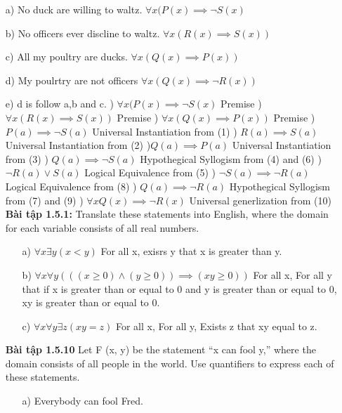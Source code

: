 \documentclass[a4paper]{article}
\begin{document}
	\begin{enumerate}
	\item[a)] No duck are willing to waltz.
	$\forall x (P(x) \implies \lnot S(x)$
	\item[b)] No officers ever discline to waltz.
	$\forall x (R(x) \implies S(x))$
	\item[c)] All my poultry are ducks.
	$\forall x (Q(x) \implies P(x))$
	\item[d)] My poulrtry are not officers
	$\forall x (Q(x) \implies \lnot R(x))$
	\item[e)] d is follow a,b and c.
	) $\forall x (P(x) \implies \lnot S(x)$ \hfill Premise
	)	 $\forall x (R(x) \implies S(x))$ \hfill Premise
	) $\forall x (Q(x) \implies P(x))$ \hfill Premise
	) $ P(a) \implies \lnot S(a)$ \hfill Universal Instantiation from (1)
	) $ R(a) \implies S(a)$ \hfill Universal Instantiation from (2)
	)$ Q(a) \implies P(a)$ \hfill Universal Instantiation from (3)
	) $ Q(a) \implies \lnot S(a)$ \hfill Hypothegical Syllogism from (4) and (6)
	) $ \lnot R(a) \lor  S(a)$ \hfill Logical Equivalence from (5)
	) $ \lnot S(a) \implies \lnot R(a)$ \hfill Logical Equivalence from (8)
	) $ Q(a) \implies \lnot R(a)$ \hfill Hypothegical Syllogism from (7) and (9)
	) $\forall x Q(x) \implies \lnot R(x)$ \hfill Universal generlization from (10)
\textbf{Bài tập 1.5.1:} Translate these statements into English, where the domain for each variable consists of all real numbers.
\begin{enumerate}
	\item[a)] $\forall x \exists y (x<y)$
	For all x, exisrs y that x is greater than y.\\
	\item[b)] $\forall x \forall y (((x \geq 0) \land (y \geq 0)) \implies (xy \geq 0))$
	For all x, For all y that if x  is greater than or equal to 0 and y is greater than or equal to 0, xy is greater than or equal to 0.\\
	\item[c)] $\forall x \forall y \exists z (xy=z)$
	For all x, For all y, Exists z that xy equal to z.\\
\end{enumerate}
\textbf{Bài tập 1.5.10} Let F (x, y) be the statement “x can fool y,” where the domain consists of all people in the world. Use quantifiers to express each of these statements.
\begin{enumerate}
	\item[a)] Everybody can fool Fred.

\end{enumerate}
\end{enumerate}
\end{document}
